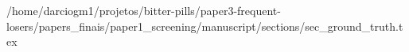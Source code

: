 /home/darciogm1/projetos/bitter-pills/paper3-frequent-losers/papers_finais/paper1_screening/manuscript/sections/sec_ground_truth.tex